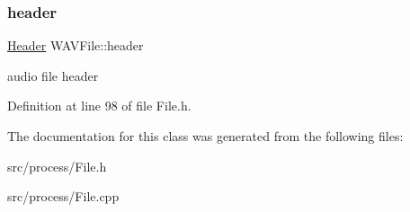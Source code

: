\mbox{\label{class_w_a_v_file_a2060260682e854baa148ebef76d81aae}} 
\subsubsection{\texorpdfstring{header}{header}}
{\footnotesize\ttfamily \hyperlink{struct_w_a_v_file_1_1_header}{Header} W\+A\+V\+File\+::header}

audio file header 

Definition at line 98 of file File.\+h.



The documentation for this class was generated from the following files\+:\begin{DoxyCompactItemize}
\item 
src/process/File.\+h\item 
src/process/File.\+cpp\end{DoxyCompactItemize}
